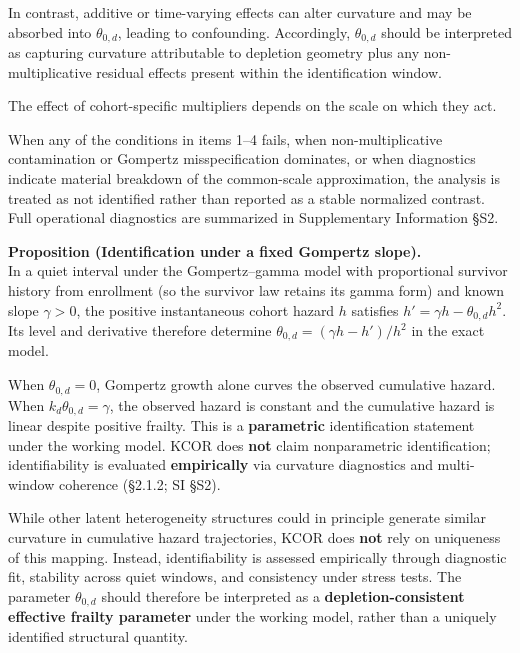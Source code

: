 \documentclass[
]{article}
\renewenvironment{quote}{\begin{mdframed}[style=kcorquote]}{\end{mdframed}}
\begin{document}
In contrast, additive or time-varying effects can alter curvature and may be absorbed into \(\theta_{0,d}\), leading to confounding. Accordingly, \(\theta_{0,d}\) should be interpreted as capturing curvature attributable to depletion geometry plus any non-multiplicative residual effects present within the identification window.

The effect of cohort-specific multipliers depends on the scale on which they act.

When any of the conditions in items 1--4 fails, when non-multiplicative contamination or Gompertz misspecification dominates, or when diagnostics indicate material breakdown of the common-scale approximation, the analysis is treated as not identified rather than reported as a stable normalized contrast. Full operational diagnostics are summarized in Supplementary Information §S2.

\begin{quote}
\textbf{Proposition (Identification under a fixed Gompertz slope).}\\
In a quiet interval under the Gompertz--gamma model with proportional survivor history from enrollment (so the survivor law retains its gamma form) and known slope \(\gamma>0\), the positive instantaneous cohort hazard \(h\) satisfies \(h'=\gamma h-\theta_{0,d}h^2\). Its level and derivative therefore determine \(\theta_{0,d}=(\gamma h-h')/h^2\) in the exact model.
\end{quote}

When \(\theta_{0,d}=0\), Gompertz growth alone curves the observed cumulative hazard. When \(k_d\theta_{0,d}=\gamma\), the observed hazard is constant and the cumulative hazard is linear despite positive frailty. This is a \textbf{parametric} identification statement under the working model. KCOR does \textbf{not} claim nonparametric identification; identifiability is evaluated \textbf{empirically} via curvature diagnostics and multi-window coherence (§2.1.2; SI §S2).

While other latent heterogeneity structures could in principle generate similar curvature in cumulative hazard trajectories, KCOR does \textbf{not} rely on uniqueness of this mapping. Instead, identifiability is assessed empirically through diagnostic fit, stability across quiet windows, and consistency under stress tests. The parameter \(\theta_{0,d}\) should therefore be interpreted as a \textbf{depletion-consistent effective frailty parameter} under the working model, rather than a uniquely identified structural quantity.
\end{document}
